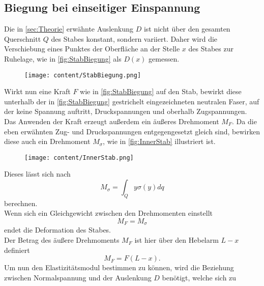 \subsection{Biegung bei einseitiger Einspannung}
\label{subsec:EinseitigeEinspannung}
Die in \autoref{sec:Theorie} erwähnte Auslenkung $D$ ist nicht über den gesamten Querschnitt $Q$ des Stabes konstant,
sondern variiert. Daher wird die Verschiebung eines Punktes der Oberfläche an der Stelle $x$ des Stabes zur Ruhelage, wie in \autoref{fig:StabBiegung}
als $D(x)$ gemessen.
\begin{figure}[H]
    \centering
    \texttt{[image: content/StabBiegung.png]}
    \label{fig:StabBiegung}
\end{figure}
Wirkt nun eine Kraft $F$ wie in \autoref{fig:StabBiegung} auf den Stab, bewirkt diese unterhalb der in \autoref{fig:StabBiegung}
gestrichelt eingezeichneten neutralen Faser, auf der keine Spannung auftritt, Druckspannungen und oberhalb Zugspannungen.
Das Anwenden der Kraft erzeugt außerdem ein äußeres Drehmoment $M_F$. Da die eben erwähnten Zug- und Druckspannungen entgegengesetzt gleich
sind, bewirken diese auch ein Drehmoment $M_{\sigma}$, wie in \autoref{fig:InnerStab} illustriert ist.
\begin{figure}[H]
    \centering
    \texttt{[image: content/InnerStab.png]}
    \label{fig:InnerStab}
\end{figure}
Dieses lässt sich nach
\begin{equation}
    \label{eqn:MSigma}
    M_{\sigma} = \int_Q y\sigma(y)dq
\end{equation}
berechnen. \\
Wenn sich ein Gleichgewicht zwischen den Drehmomenten 
einstellt
\begin{equation}
    \label{eqn:MGleich}
    M_F = M_{\sigma}
\end{equation}
endet die Deformation des Stabes.\\
Der Betrag des äußere Drehmoments $M_F$ ist hier über den Hebelarm $L-x$ definiert
\begin{equation}
    \label{eqn:MF}
    M_F = F(L-x).
\end{equation}
Um nun den Elastizitätsmodul bestimmen zu können, wird die Beziehung zwischen Normalspannung und der Auslenkung $D$ benötigt,
welche sich zu
